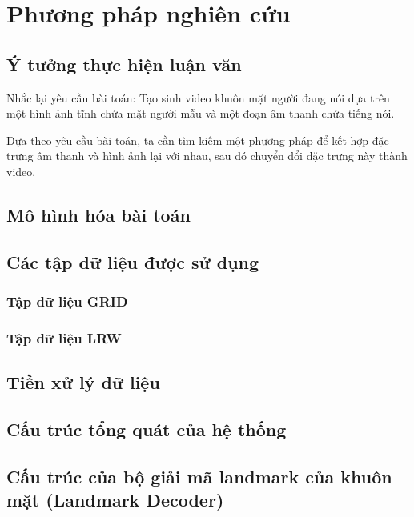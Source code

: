 \section{\texorpdfstring{Phương pháp nghiên cứu}{methodology}}

\subsection{Ý tưởng thực hiện luận văn}

Nhắc lại yêu cầu bài toán: Tạo sinh video khuôn mặt người đang nói dựa trên một hình ảnh tĩnh chứa mặt người mẫu và một đoạn âm thanh chứa tiếng nói.

Dựa theo yêu cầu bài toán, ta cần tìm kiếm một phương pháp để kết hợp đặc trưng âm thanh và hình ảnh lại với nhau, sau đó chuyển đổi đặc trưng này thành video.

\subsection{Mô hình hóa bài toán}

\subsection{Các tập dữ liệu được sử dụng}
\subsubsection{Tập dữ liệu GRID}
\subsubsection{Tập dữ liệu LRW}

\subsection{Tiền xử lý dữ liệu}

\subsection{Cấu trúc tổng quát của hệ thống}

\subsection{Cấu trúc của bộ giải mã landmark của khuôn mặt (Landmark Decoder)}

